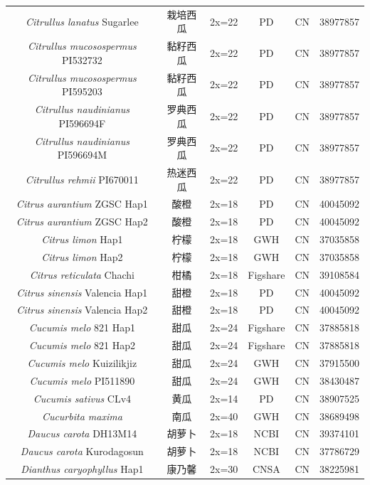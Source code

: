 {{\begin{longtable}{cccccc}
    \textit{Citrullus lanatus} Sugarlee & 栽培西瓜 & 2x=22 & PD & CN & 38977857 \\
    \textit{Citrullus mucosospermus} PI532732 & 黏籽西瓜 & 2x=22 & PD & CN & 38977857 \\
    \textit{Citrullus mucosospermus} PI595203 & 黏籽西瓜 & 2x=22 & PD & CN & 38977857 \\
    \textit{Citrullus naudinianus} PI596694F & 罗典西瓜 & 2x=22 & PD & CN & 38977857 \\
    \textit{Citrullus naudinianus} PI596694M & 罗典西瓜 & 2x=22 & PD & CN & 38977857 \\
    \textit{Citrullus rehmii} PI670011 & 热迷西瓜 & 2x=22 & PD & CN & 38977857 \\
    \textit{Citrus aurantium} ZGSC Hap1 & 酸橙 & 2x=18 & PD & CN & 40045092 \\
    \textit{Citrus aurantium} ZGSC Hap2 & 酸橙 & 2x=18 & PD & CN & 40045092 \\
    \textit{Citrus limon} Hap1 & 柠檬 & 2x=18 & GWH & CN & 37035858 \\
    \textit{Citrus limon} Hap2 & 柠檬 & 2x=18 & GWH & CN & 37035858 \\
    \textit{Citrus reticulata} Chachi & 柑橘 & 2x=18 & Figshare & CN & 39108584 \\
    \textit{Citrus sinensis} Valencia Hap1 & 甜橙 & 2x=18 & PD & CN & 40045092 \\
    \textit{Citrus sinensis} Valencia Hap2 & 甜橙 & 2x=18 & PD & CN & 40045092 \\
    \textit{Cucumis melo} 821 Hap1 & 甜瓜 & 2x=24 & Figshare & CN & 37885818 \\
    \textit{Cucumis melo} 821 Hap2 & 甜瓜 & 2x=24 & Figshare & CN & 37885818 \\
    \textit{Cucumis melo} Kuizilikjiz & 甜瓜 & 2x=24 & GWH & CN & 37915500 \\
    \textit{Cucumis melo} PI511890 & 甜瓜 & 2x=24 & GWH & CN & 38430487 \\
    \textit{Cucumis sativus} CLv4 & 黄瓜 & 2x=14 & PD & CN & 38907525 \\
    \textit{Cucurbita maxima} & 南瓜 & 2x=40 & GWH & CN & 38689498 \\
    \textit{Daucus carota} DH13M14 & 胡萝卜 & 2x=18 & NCBI & CN & 39374101 \\
    \textit{Daucus carota} Kurodagosun & 胡萝卜 & 2x=18 & NCBI & CN & 37786729 \\
    \textit{Dianthus caryophyllus} Hap1 & 康乃馨 & 2x=30 & CNSA & CN & 38225981 \\

\end{longtable}}}
